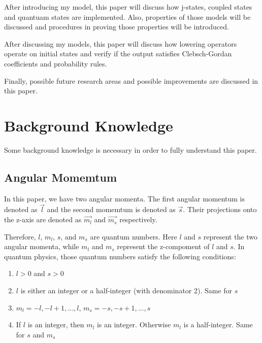 \documentclass[12pt,journal,compsoc]{IEEEtran}
\begin{document}
After introducing my model, this paper will discuss how j-states, coupled states and quantuam states are implemented. Also, properties of those models will be discussed and procedures in proving those properties will be introduced.

After discussing my models, this paper will discuss how lowering operators operate on initial states and verify if the output satisfies Clebsch-Gordan coefficients and probability rules.

Finally, possible future research areas and possible improvements are discussed in this paper.


\section{Background Knowledge}

Some background knowledge is necessary in order to fully understand this paper.

\subsection{Angular Momemtum}

In this paper, we have two angular momenta. The first angular momentum is denoted as $\vec{l}$ and the second momemtum is denoted as $\vec{s}$. Their projections onto the z-axis are denoted as $\vec{m_l}$ and $\vec{m_s}$ respectively. 

Therefore, $l$, $m_l$, $s$, and $m_s$ are quantum numbers. Here $l$ and $s$ represent the two angular momenta, while $m_l$ and $m_s$ represent the z-compoment of $l$ and $s$. In quantum physics, those quantum numbers satisfy the following conditions:

\begin{enumerate}

\item $l>0$ and $s>0$

\item $l$ is either an integer or a half-integer (with denominator 2). Same for $s$

\item $m_l= -l, -l+1, \ldots, l$, $m_s= -s, -s+1, \ldots, s$

\item If $l$ is an integer, then $m_l$ is an integer. Otherwise $m_l$ is a half-integer. Same for $s$ and $m_s$

\end{enumerate}
\end{document}

